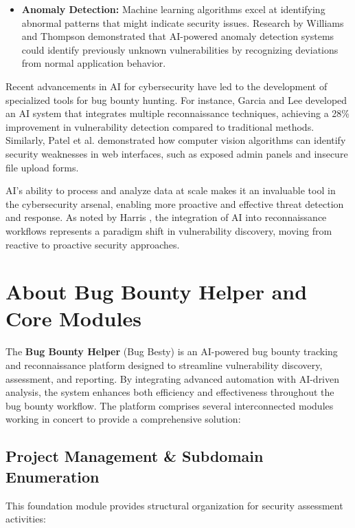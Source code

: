 \documentclass[conference]{IEEEtran}
\begin{document}
\begin{itemize}
    \item \textbf{Anomaly Detection:} Machine learning algorithms excel at identifying abnormal patterns that might indicate security issues. Research by Williams and Thompson \cite{williams2020} demonstrated that AI-powered anomaly detection systems could identify previously unknown vulnerabilities by recognizing deviations from normal application behavior.
\end{itemize}

Recent advancements in AI for cybersecurity have led to the development of specialized tools for bug bounty hunting. For instance, Garcia and Lee \cite{garcia2022} developed an AI system that integrates multiple reconnaissance techniques, achieving a 28\% improvement in vulnerability detection compared to traditional methods. Similarly, Patel et al. \cite{patel2021} demonstrated how computer vision algorithms can identify security weaknesses in web interfaces, such as exposed admin panels and insecure file upload forms.

AI's ability to process and analyze data at scale makes it an invaluable tool in the cybersecurity arsenal, enabling more proactive and effective threat detection and response. As noted by Harris \cite{harris2023}, the integration of AI into reconnaissance workflows represents a paradigm shift in vulnerability discovery, moving from reactive to proactive security approaches.

\section{About Bug Bounty Helper and Core Modules}
The \textbf{Bug Bounty Helper} (Bug Besty) is an AI-powered bug bounty tracking and reconnaissance platform designed to streamline vulnerability discovery, assessment, and reporting. By integrating advanced automation with AI-driven analysis, the system enhances both efficiency and effectiveness throughout the bug bounty workflow. The platform comprises several interconnected modules working in concert to provide a comprehensive solution:

\subsection{Project Management \& Subdomain Enumeration}
This foundation module provides structural organization for security assessment activities:
\end{document}
